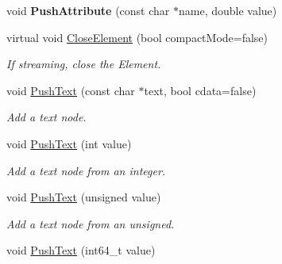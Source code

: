 \begin{DoxyCompactItemize}
\item 
void {\bfseries Push\+Attribute} (const char $\ast$name, double value)\hypertarget{classtinyxml2_1_1XMLPrinter_a1714867af40e68ca404c3e84b6cac2a6}{}\label{classtinyxml2_1_1XMLPrinter_a1714867af40e68ca404c3e84b6cac2a6}

\item 
virtual void \hyperlink{classtinyxml2_1_1XMLPrinter_af1fb439e5d800999646f333fa2f0699a}{Close\+Element} (bool compact\+Mode=false)\hypertarget{classtinyxml2_1_1XMLPrinter_af1fb439e5d800999646f333fa2f0699a}{}\label{classtinyxml2_1_1XMLPrinter_af1fb439e5d800999646f333fa2f0699a}

\begin{DoxyCompactList}\small\item\em If streaming, close the Element. \end{DoxyCompactList}\item 
void \hyperlink{classtinyxml2_1_1XMLPrinter_a1cc16a9362df4332012cb13cff6441b3}{Push\+Text} (const char $\ast$text, bool cdata=false)\hypertarget{classtinyxml2_1_1XMLPrinter_a1cc16a9362df4332012cb13cff6441b3}{}\label{classtinyxml2_1_1XMLPrinter_a1cc16a9362df4332012cb13cff6441b3}

\begin{DoxyCompactList}\small\item\em Add a text node. \end{DoxyCompactList}\item 
void \hyperlink{classtinyxml2_1_1XMLPrinter_a3e0d4d78de25d4cf081009e1431cea7e}{Push\+Text} (int value)\hypertarget{classtinyxml2_1_1XMLPrinter_a3e0d4d78de25d4cf081009e1431cea7e}{}\label{classtinyxml2_1_1XMLPrinter_a3e0d4d78de25d4cf081009e1431cea7e}

\begin{DoxyCompactList}\small\item\em Add a text node from an integer. \end{DoxyCompactList}\item 
void \hyperlink{classtinyxml2_1_1XMLPrinter_a661fb50e7e0a4918d2d259cb0fae647e}{Push\+Text} (unsigned value)\hypertarget{classtinyxml2_1_1XMLPrinter_a661fb50e7e0a4918d2d259cb0fae647e}{}\label{classtinyxml2_1_1XMLPrinter_a661fb50e7e0a4918d2d259cb0fae647e}

\begin{DoxyCompactList}\small\item\em Add a text node from an unsigned. \end{DoxyCompactList}\item 
void \hyperlink{classtinyxml2_1_1XMLPrinter_a96b0a0bfe105154a0a6c37d725258f0a}{Push\+Text} (int64\+\_\+t value)\hypertarget{classtinyxml2_1_1XMLPrinter_a96b0a0bfe105154a0a6c37d725258f0a}{}\label{classtinyxml2_1_1XMLPrinter_a96b0a0bfe105154a0a6c37d725258f0a}


\end{DoxyCompactItemize}
